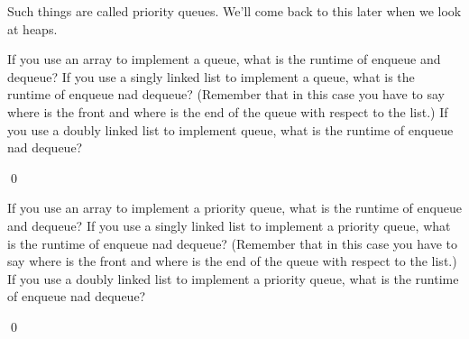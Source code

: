 

Such things are called priority queues.
We'll come back to this later when we look at heaps.


\begin{ex}
  \begin{tightlist}
    \li If you use an array to implement a queue, what is the
    runtime of enqueue and dequeue?
    \li If you use a singly linked list to implement a queue, what is the
    runtime of enqueue nad dequeue? (Remember that in this case
    you have to say where is the front and where is the end of the queue
    with respect to the list.)
    \li If you use a doubly linked list to implement queue, what is the
    runtime of enqueue nad dequeue? 
  \end{tightlist}
  \qed
\end{ex}

\begin{ex}
  \begin{tightlist}
    \li If you use an array to implement a priority queue, what is the
    runtime of enqueue and dequeue?
    \li If you use a singly linked list to implement a priority
    queue, what is the
    runtime of enqueue nad dequeue? (Remember that in this case
    you have to say where is the front and where is the end of the queue
    with respect to the list.)
    \li If you use a doubly linked list to implement a priority
    queue, what is the
    runtime of enqueue nad dequeue? 
  \end{tightlist}
  \qed
\end{ex}
